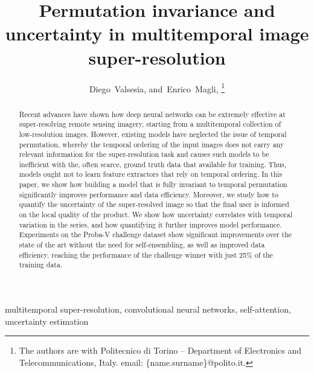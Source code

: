 \documentclass[journal]{IEEEtran}
\begin{document}
\title{Permutation invariance and uncertainty in multitemporal image super-resolution}


\author{Diego~Valsesia, 
        and~Enrico~Magli, \thanks{The authors are with Politecnico di Torino -- Department of Electronics and Telecommunications, Italy. email: \{name.surname\}@polito.it.}
}




















\maketitle

\begin{abstract}
Recent advances have shown how deep neural networks can be extremely effective at super-resolving remote sensing imagery, starting from a multitemporal collection of low-resolution images. However, existing models have neglected the issue of temporal permutation, whereby the temporal ordering of the input images does not carry any relevant information for the super-resolution task and causes such models to be inefficient with the, often scarce, ground truth data that available for training. Thus, models ought not to learn feature extractors that rely on temporal ordering. In this paper, we show how building a model that is fully invariant to temporal permutation significantly improves performance and data efficiency. Moreover, we study how to quantify the uncertainty of the super-resolved image so that the final user is informed on the local quality of the product. We show how uncertainty correlates with temporal variation in the series, and how quantifying it further improves model performance. Experiments on the Proba-V challenge dataset show significant improvements over the state of the art without the need for self-ensembling, as well as improved data efficiency, reaching the performance of the challenge winner with just 25$\%$ of the training data.
\end{abstract}

\begin{IEEEkeywords}
multitemporal super-resolution, convolutional neural networks, self-attention, uncertainty estimation 
\end{IEEEkeywords}
\end{document}
